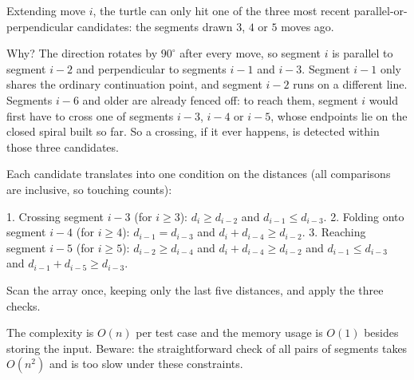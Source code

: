 Extending move $i$, the turtle can only hit one of the three most recent parallel-or-perpendicular candidates: the segments drawn $3$, $4$ or $5$ moves ago.

Why? The direction rotates by $90^\circ$ after every move, so segment $i$ is parallel to segment $i - 2$ and perpendicular to segments $i - 1$ and $i - 3$. Segment $i - 1$ only shares the ordinary continuation point, and segment $i - 2$ runs on a different line. Segments $i - 6$ and older are already fenced off: to reach them, segment $i$ would first have to cross one of segments $i - 3$, $i - 4$ or $i - 5$, whose endpoints lie on the closed spiral built so far. So a crossing, if it ever happens, is detected within those three candidates.

Each candidate translates into one condition on the distances (all comparisons are inclusive, so touching counts):

1. Crossing segment $i - 3$ (for $i \ge 3$): $d_i \ge d_{i - 2}$ and $d_{i - 1} \le d_{i - 3}$.
2. Folding onto segment $i - 4$ (for $i \ge 4$): $d_{i - 1} = d_{i - 3}$ and $d_i + d_{i - 4} \ge d_{i - 2}$.
3. Reaching segment $i - 5$ (for $i \ge 5$): $d_{i - 2} \ge d_{i - 4}$ and $d_i + d_{i - 4} \ge d_{i - 2}$ and $d_{i - 1} \le d_{i - 3}$ and $d_{i - 1} + d_{i - 5} \ge d_{i - 3}$.

Scan the array once, keeping only the last five distances, and apply the three checks.

The complexity is $O(n)$ per test case and the memory usage is $O(1)$ besides storing the input. Beware: the straightforward check of all pairs of segments takes $O(n^2)$ and is too slow under these constraints.

